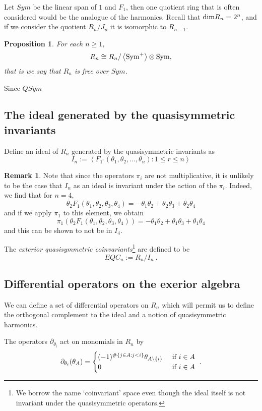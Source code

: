 \documentclass[11pt]{amsart}
\newtheorem{prop}[theorem]{Proposition}
\theoremstyle{definition}
\newtheorem{remark}[theorem]{Remark}
\numberwithin{equation}{section}
\begin{document}
Let $Sym$ be the linear span of $1$ and $F_1$,
then one quotient ring that is often considered
would be the analogue of the harmonics.  Recall that ${\rm dim} R_n = 2^n$,
and if we consider the quotient $R_n/J_n$ it is isomorphic to $R_{n-1}$.
\begin{prop}
For each $n \geq 1$,
$$R_n \cong R_n/\left< {\rm Sym}^+ \right> \otimes {\rm Sym},$$
that is we say that $R_n$ is free over $Sym$.
\end{prop}

Since $QSym$

\subsection{The ideal generated by the quasisymmetric invariants}

Define an ideal of $R_n$ generated by the quasisymmetric invariants as
\[
I_n := \left< F_{1^r}(\theta_1, \theta_2, \ldots, \theta_n) : 1 \leq r \leq n \right>
\]

\begin{remark}
Note that since the operators $\pi_i$ are not multiplicative, it
is unlikely to be the case that $I_n$ as an ideal is invariant
under the action of the $\pi_i$.  Indeed, we find that for $n=4$,
\[
\theta_2 F_{1}(\theta_1, \theta_2, \theta_3, \theta_4) =
-\theta_1 \theta_2 + \theta_2 \theta_3 + \theta_2 \theta_4
\]
and if we apply $\pi_1$ to this element, we obtain
\[
\pi_1(\theta_2 F_{1}(\theta_1, \theta_2, \theta_3, \theta_4)) =
-\theta_1 \theta_2 + \theta_1 \theta_3 + \theta_1 \theta_4
\]
and this can be shown to not be in $I_4$.
\end{remark}

The \emph{exterior quasisymmetric coinvariants}\footnote{We borrow
the name `coinvariant' space even though the ideal itself is not
invariant under the quasisymmetric operators.} are defined to be
\[
EQC_n := R_n/I_n~.
\]


\subsection{Differential operators on the exerior algebra}\label{ssec:harm}
We can define a set of differential operators on $R_n$ which
will permit us to define the orthogonal complement to the
ideal and a notion of quasisymmetric harmonics.

The operators $\partial_{\theta_i}$ act on monomials in $R_n$
by
\[
\partial_{\theta_i}( \theta_A ) = \begin{cases}
(-1)^{\#\{ j \in A: j<i\}}\theta_{A \backslash \{i\}}&\hbox{ if }i \in A\\
0&\hbox{ if }i \in A
\end{cases}~.
\]
\end{document}

